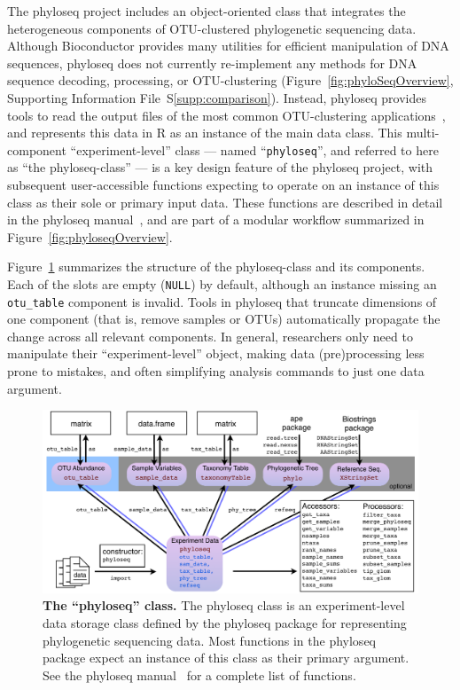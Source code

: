\documentclass[10pt]{article}\usepackage{graphicx, color}
\newcommand{\R}{{\textsf{R}}}
\newcommand{\code}[1]{{\texttt{#1}}}
\begin{document}
The phyloseq project includes an object-oriented class
that integrates the heterogeneous components of
OTU-clustered phylogenetic sequencing data.
Although Bioconductor provides many utilities
for efficient manipulation of DNA sequences, 
phyloseq does not currently re-implement 
any methods for DNA sequence
decoding, processing, or OTU-clustering
(Figure~\ref{fig:phyloSeqOverview}, Supporting Information File~S\ref{supp:comparison}). 
Instead, phyloseq provides tools to read the output files
of the most common OTU-clustering applications~\cite{caporaso2010qiime,mothur,Cole:2009dm,Kunin:2010wd},
and represents this data in \R{}
as an instance of the main data class.
This multi-component ``experiment-level'' class ---
named ``\code{phyloseq}'', and referred to here as ``the phyloseq-class''
--- 
is a key design feature of the phyloseq project,
with subsequent user-accessible functions
expecting to operate on an instance of this
class as their sole or primary input data.
These functions are described in detail
in the phyloseq manual~\cite{phyloseq:man:link},
and are part of a modular workflow
summarized in Figure~\ref{fig:phyloseqOverview}.

Figure~\ref{fig:phyloseqBaseClasses} summarizes the structure
of the phyloseq-class and its components.
Each of the slots are empty (\code{NULL}) by default,
although an instance missing an \code{otu{\_}table} component is invalid.
Tools in phyloseq that truncate dimensions of one component
(that is, remove samples or OTUs)
automatically propagate the change across all relevant components.
In general, researchers only need to manipulate their
``experiment-level'' object, 
making data (pre)processing less prone to mistakes, 
and often simplifying analysis commands to just one data argument.

\begin{figure}[!htbp]
\begin{center}
\includegraphics[width=\textwidth]{phyloseq_classes_7.pdf}
\end{center}
\caption{
{\bf The ``phyloseq'' class.}
The phyloseq class is an experiment-level
data storage class defined by the phyloseq package
for representing phylogenetic sequencing data.
Most functions in the phyloseq package
expect an instance of this class as their primary argument.
See the phyloseq manual~\cite{phyloseq:man:link}
for a complete list of functions.
}
\label{fig:phyloseqBaseClasses}
\end{figure}
\end{document}
